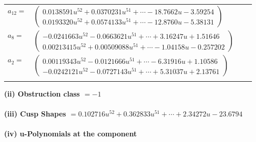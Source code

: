 \documentclass[1p]{elsarticle_modified}
\theoremstyle{definition}
\begin{document}
\begin{tabular}{m{7pt} m{180pt} m{7pt} m{180pt} }
\flushright $a_{12}=$&$\begin{pmatrix}0.0138591 u^{52}+0.0370231 u^{51}+\cdots-18.7662 u-3.59254\\0.0193320 u^{52}+0.0574133 u^{51}+\cdots-12.8760 u-5.38131\end{pmatrix}$ \\
\flushright $a_{8}=$&$\begin{pmatrix}-0.0241663 u^{52}-0.0663621 u^{51}+\cdots+3.16247 u+1.51646\\0.00213415 u^{52}+0.00509088 u^{51}+\cdots-1.04158 u-0.257202\end{pmatrix}$ \\
\flushright $a_{2}=$&$\begin{pmatrix}0.00119343 u^{52}-0.0121666 u^{51}+\cdots-6.31916 u+1.10586\\-0.0242121 u^{52}-0.0727143 u^{51}+\cdots+5.31037 u+2.13761\end{pmatrix}$\\&\end{tabular}
\flushleft \textbf{(ii) Obstruction class $= -1$}\\~\\
\flushleft \textbf{(iii) Cusp Shapes $= 0.102716 u^{52}+0.362833 u^{51}+\cdots+2.34272 u-23.6794$}\\~\\
\newpage\renewcommand{\arraystretch}{1}
\flushleft \textbf{(iv) u-Polynomials at the component}\newline \\
\end{document}
